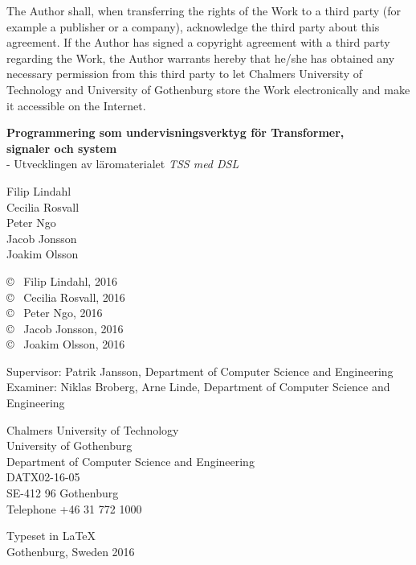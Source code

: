 The Author shall, when transferring the rights of the Work to a third
party (for example a publisher or a company), acknowledge the third
party about this agreement. If the Author has signed a copyright
agreement with a third party regarding the Work, the Author warrants
hereby that he/she has obtained any necessary permission from this
third party to let Chalmers University of Technology and University of
Gothenburg store the Work electronically and make it accessible on the
Internet.

\vspace{1.5cm}

\textbf{Programmering som undervisningsverktyg för Transformer, \\ signaler och system} \\
- Utvecklingen av läromaterialet \textit{TSS med DSL}


\vspace{1cm}

Filip Lindahl   \\
Cecilia Rosvall \\
Peter Ngo       \\
Jacob Jonsson   \\
Joakim Olsson

\copyright ~ Filip Lindahl, 2016  \\
\copyright ~ Cecilia Rosvall, 2016\\
\copyright ~ Peter Ngo, 2016      \\
\copyright ~ Jacob Jonsson, 2016  \\
\copyright ~ Joakim Olsson, 2016
\vspace{0.5cm}

Supervisor: Patrik Jansson, Department of Computer Science and Engineering \\
Examiner: Niklas Broberg, Arne Linde, Department of Computer Science and Engineering
\vspace{0.5cm}

Chalmers University of Technology\\
University of Gothenburg \\
Department of Computer Science and Engineering \\
DATX02-16-05 \\
SE-412 96 Gothenburg\\
Telephone +46 31 772 1000 \setlength{\parskip}{0.5cm}

\vfill
Typeset in \LaTeX \\
Gothenburg, Sweden 2016
